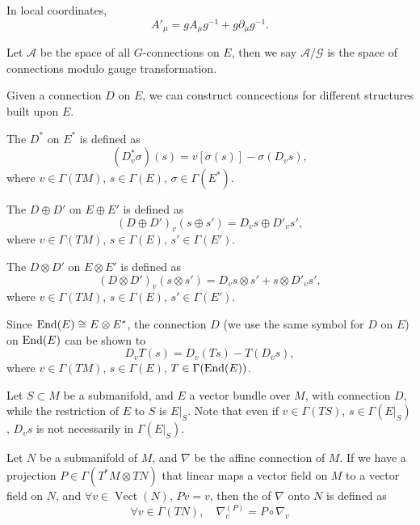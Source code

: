 \documentclass[openany, oneside, a5paper]{book}
\DeclareMathOperator{\Vect}{Vect}
\begin{document}
In local coordinates, 
\begin{equation}
    A'_\mu = g A_\mu g^{-1} + g \partial_\mu g^{-1}.
\end{equation}

Let $\mathcal A$ be the space of all $G$-connections on $E$, then we say $\mathcal A / \mathcal G$ is the space of connections modulo gauge transformation.

Given a connection $D$ on $E$, we can construct conncections for different structures built upon $E$.

The  $D^*$ on $E^*$ is defined as
\begin{equation}
    (D^*_v \sigma) (s) = v[\sigma(s)] - \sigma (D_v s),
\end{equation}
where $v \in \Gamma(TM)$, $s \in \Gamma(E)$, $\sigma \in \Gamma(E^*)$.

The  $D \oplus D'$ on $E \oplus E'$ is defined as
\begin{equation}
    (D \oplus D')_v (s \oplus s') = D_v s \oplus D'_v s',
\end{equation}
where $v \in \Gamma(TM)$, $s \in \Gamma(E)$, $s' \in \Gamma(E')$.

The  $D \otimes D'$ on $E \otimes E'$ is defined as
\begin{equation}
    (D \otimes D')_v (s \otimes s') = D_v s \otimes s' + s \otimes D'_v s',
\end{equation}
where $v \in \Gamma(TM)$, $s \in \Gamma(E)$, $s' \in \Gamma(E')$.

Since $\operatorname{End}(E) \cong E \otimes E^*$, the connection $D$ (we use the same symbol for $D$ on $E$) on $\operatorname{End}(E)$ can be shown to 
\begin{equation}
    D_v T (s) = D_v(Ts) - T(D_v s),
\end{equation}
where $v \in \Gamma(TM)$, $s \in \Gamma(E)$, $T \in \Gamma(\operatorname{End}(E))$.

Let $S \subset M$ be a submanifold, 
and $E$ a vector bundle over $M$, 
with connection $D$, while the restriction of $E$ to $S$ is $E|_S$.
Note that even if $v \in \Gamma(TS)$, $s \in \Gamma(E|_S)$, 
$D_v s $ is not necessarily in $\Gamma(E|_S)$.

\begin{definition}
    Let $N$ be a submanifold of $M$, and $\nabla$ be the affine connection of $M$.
    If we have a projection $P \in \Gamma(T^*M \otimes TN)$ that linear maps a vector field on $M$ to a vector field on $N$, and $\forall v \in \Vect(N)$, $Pv = v$,
    then the  of $\nabla$ onto $N$ is defined as
    \begin{equation}
        \forall v \in \Gamma(TN), \quad
        \nabla^{(P)}_v = P \circ \nabla_v
    \end{equation}
\end{definition}
\end{document}
